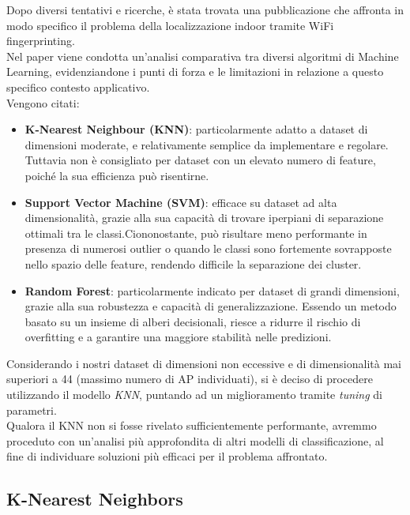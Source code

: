 \documentclass{article}
\begin{document}
Dopo diversi tentativi e ricerche, è stata trovata una pubblicazione \cite{Shang2022} che affronta in modo specifico il problema della localizzazione indoor tramite WiFi fingerprinting.\\
Nel paper viene condotta un'analisi comparativa tra diversi algoritmi di Machine Learning, evidenziandone i punti di forza e le limitazioni in relazione a questo specifico contesto applicativo.\\
Vengono citati:
\begin{itemize}
    \item \textbf{K-Nearest Neighbour (KNN)}: particolarmente adatto a dataset di dimensioni moderate, e relativamente semplice da implementare e regolare. Tuttavia non è consigliato per dataset con un elevato numero di feature, poiché la sua efficienza può risentirne.
    \item \textbf{Support Vector Machine (SVM)}: efficace su dataset ad alta dimensionalità, grazie alla sua capacità di trovare iperpiani di separazione ottimali tra le classi.Ciononostante, può risultare meno performante in presenza di numerosi outlier o quando le classi sono fortemente sovrapposte nello spazio delle feature, rendendo difficile la separazione dei cluster.
    \item \textbf{Random Forest}: particolarmente indicato per dataset di grandi dimensioni, grazie alla sua robustezza e capacità di generalizzazione. Essendo un metodo basato su un insieme di alberi decisionali, riesce a ridurre il rischio di overfitting e a garantire una maggiore stabilità nelle predizioni.
\end{itemize}

Considerando i nostri dataset di dimensioni non eccessive e di dimensionalità mai superiori a 44 (massimo numero di AP individuati), si è deciso di procedere utilizzando il modello \textit{KNN}, puntando ad un miglioramento tramite \textit{tuning} di parametri.\\
Qualora il KNN non si fosse rivelato sufficientemente performante, avremmo proceduto con un'analisi più approfondita di altri modelli di classificazione, al fine di individuare soluzioni più efficaci per il problema affrontato.

\subsection{K-Nearest Neighbors}
\end{document}
